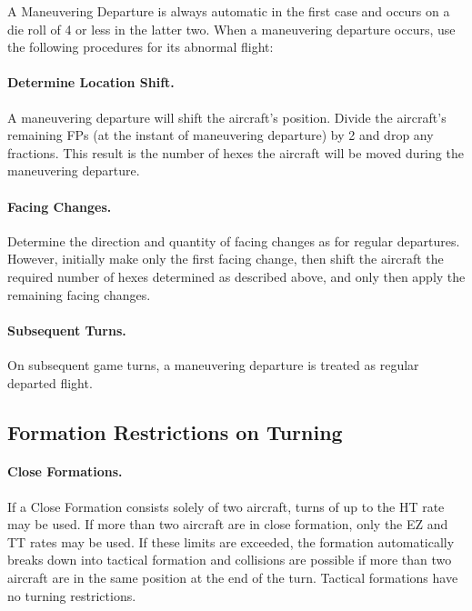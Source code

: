 A Maneuvering Departure is always automatic in the first case and occurs on a die roll of 4 or less in the latter two.  When a maneuvering departure occurs, use the following procedures for its abnormal flight:

\paragraph{Determine Location Shift.} A maneuvering departure will shift the aircraft's position. Divide the aircraft's remaining FPs (at the instant of maneuvering departure) by 2 and drop any fractions. This result is the number of hexes the aircraft will be moved during the maneuvering departure.

\paragraph{Facing Changes.} Determine the direction and quantity of facing changes as for regular departures. However, initially make only the first facing change, then shift the aircraft the required number of hexes determined as described above, and only then apply the remaining facing changes.


\paragraph{Subsequent Turns.} On subsequent game turns, a maneuvering departure is treated as regular departed flight.

\subsection{Formation Restrictions on Turning}

\paragraph{Close Formations.} If a Close Formation consists solely of two aircraft, turns of up to the HT rate may be used. If more than two aircraft are in close formation, only the EZ and TT rates may be used. If these limits are exceeded, the formation automatically breaks down into tactical formation and collisions are possible if more than two aircraft are in the same position at the end of the turn. Tactical formations have no turning restrictions.